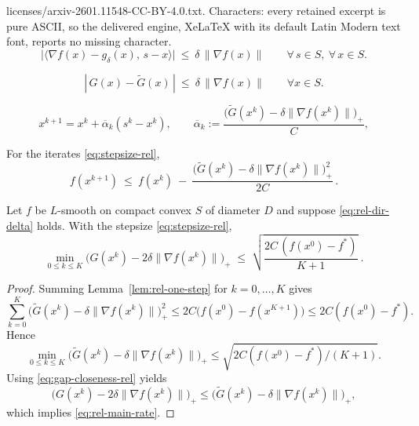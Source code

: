 \documentclass[10pt,a4paper]{amsart}
\begin{document}
licenses/arxiv-2601.11548-CC-BY-4.0.txt. Characters: every retained excerpt is pure ASCII, so the delivered engine, XeLaTeX with its default Latin Modern text font, reports no missing character.
\begin{equation}\label{eq:rel-dir-delta}
\big|\langle \nabla f(x)-g_\delta(x),\,s-x\rangle\big|\ \le\ \delta \,\|\nabla f(x)\|\qquad\forall\,s\in S,\ \forall\,x\in S .
\end{equation}

\begin{equation}\label{eq:gap-closeness-rel}
|\,G(x)-\tilde G(x)\,|\ \le\ \delta\,\|\nabla f(x)\|\qquad\forall x\in S.
\end{equation}

\begin{equation}\label{eq:stepsize-rel}
x^{k+1}=x^k+\overline\alpha_k(s^k-x^k),\qquad
\overline\alpha_k:=\frac{\big(\tilde G(x^k)-\delta\|\nabla f(x^k)\|\big)_+}{C},
\end{equation}

\begin{lem}\label{lem:rel-one-step}
For the iterates \eqref{eq:stepsize-rel},
\[
f(x^{k+1})\ \le\ f(x^k)\ -\ \frac{\big(\tilde G(x^k)-\delta\|\nabla f(x^k)\|\big)_+^2}{2C}\, .
\]
\end{lem}

\begin{theorem}\label{thm:rel-nc}
Let $f$ be $L$-smooth on compact convex $S$ of diameter $D$ and suppose \eqref{eq:rel-dir-delta} holds. With the stepsize \eqref{eq:stepsize-rel},
\begin{equation}\label{eq:rel-main-rate}
\min_{0\le k\le K}\big(G(x^k)-2\delta\|\nabla f(x^k)\|\big)_+
\;\le\; \sqrt{\frac{2C\,(f(x^0)-f^*)}{K+1}}\ .
\end{equation}
\end{theorem}

\begin{proof}
Summing Lemma~\ref{lem:rel-one-step} for $k=0,\dots,K$ gives
\[
\sum_{k=0}^K\big(\tilde G(x^k)-\delta\|\nabla f(x^k)\|\big)_+^2
\le 2C\big(f(x^0)-f(x^{K+1})\big)\le 2C(f(x^0)-f^*).
\]
Hence
\[
\min_{0\le k\le K}\big(\tilde G(x^k)-\delta\|\nabla f(x^k)\|\big)_+
\le \sqrt{2C(f(x^0)-f^*)/(K+1)}.
\]
Using \eqref{eq:gap-closeness-rel} yields
\[
\big(G(x^k)-2\delta\|\nabla f(x^k)\|\big)_+\le
\big(\tilde G(x^k)-\delta\|\nabla f(x^k)\|\big)_+,
\]
which implies \eqref{eq:rel-main-rate}.
\end{proof}
\end{document}
